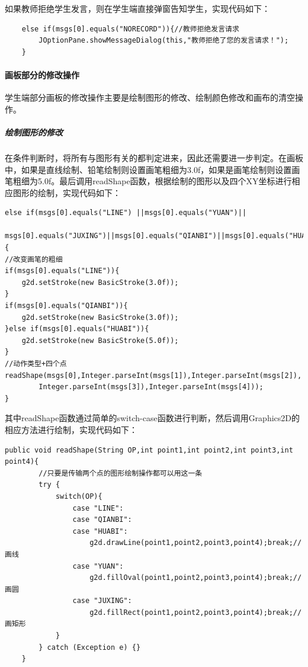\documentclass[UTF8,12pt]{article}
\begin{document}
如果教师拒绝学生发言，则在学生端直接弹窗告知学生，实现代码如下：
\begin{lstlisting}
    else if(msgs[0].equals("NORECORD")){//教师拒绝发言请求
        JOptionPane.showMessageDialog(this,"教师拒绝了您的发言请求！");
    }
\end{lstlisting}

\paragraph{画板部分的修改操作}
学生端部分画板的修改操作主要是绘制图形的修改、绘制颜色修改和画布的清空操作。

\subparagraph{绘制图形的修改}
在条件判断时，将所有与图形有关的都判定进来，因此还需要进一步判定。在画板中，如果是直线绘制、铅笔绘制则设置画笔粗细为3.0f，如果是画笔绘制则设置画笔粗细为5.0f。最后调用readShape函数，根据绘制的图形以及四个XY坐标进行相应图形的绘制，实现代码如下：

\begin{lstlisting}[title=绘制图形的修改,frame=shadowbox]
    else if(msgs[0].equals("LINE") ||msgs[0].equals("YUAN")||
    msgs[0].equals("JUXING")||msgs[0].equals("QIANBI")||msgs[0].equals("HUABI")) {
//改变画笔的粗细
if(msgs[0].equals("LINE")){
    g2d.setStroke(new BasicStroke(3.0f));
}
if(msgs[0].equals("QIANBI")){
    g2d.setStroke(new BasicStroke(3.0f));
}else if(msgs[0].equals("HUABI")){
    g2d.setStroke(new BasicStroke(5.0f));
}
//动作类型+四个点
readShape(msgs[0],Integer.parseInt(msgs[1]),Integer.parseInt(msgs[2]),
        Integer.parseInt(msgs[3]),Integer.parseInt(msgs[4]));
}
\end{lstlisting}

其中readShape函数通过简单的switch-case函数进行判断，然后调用Graphics2D的相应方法进行绘制，实现代码如下：

\begin{lstlisting}[title=readShape函数,frame=shadowbox]
    public void readShape(String OP,int point1,int point2,int point3,int point4){
        //只要是传输两个点的图形绘制操作都可以用这一条
        try {
            switch(OP){
                case "LINE":
                case "QIANBI":
                case "HUABI":
                    g2d.drawLine(point1,point2,point3,point4);break;//画线
                case "YUAN":
                    g2d.fillOval(point1,point2,point3,point4);break;//画圆
                case "JUXING":
                    g2d.fillRect(point1,point2,point3,point4);break;//画矩形
            }
        } catch (Exception e) {}
    }
\end{lstlisting}
\end{document}
